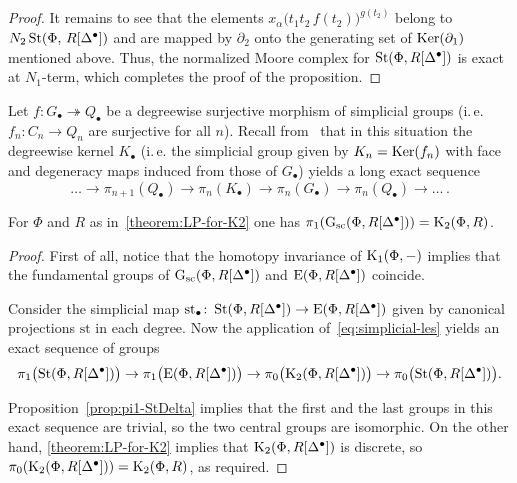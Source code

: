 \documentclass[oneside, 11pt]{amsart} \pdfoutput=1
\begin{document}
\begin{proof}
It remains to see that the elements $x_{\alpha}\big(t_1t_2\,f(t_2)\big)^{g(t_2)}$ belong to $N_2\mathop{\mathrm{St}}\nolimits(\Phi,\,R[\Delta^\bullet])$ and are mapped by $\partial_2$ onto the generating set of $\mathop{\mathrm{Ker}}\nolimits(\partial_1)$ mentioned above. Thus, the normalized Moore complex for $\mathop{\mathrm{St}}\nolimits(\Phi, R[\Delta^\bullet])$ is exact at $N_1$-term, which completes the proof of the proposition. \end{proof}

Let $f\colon G_\bullet\twoheadrightarrow Q_\bullet$ be a degreewise surjective morphism of simplicial groups (i.\,e. $f_n\colon C_n\to Q_n$ are surjective for all $n$). Recall from~\cite[Theorem~1.3]{Ina75} that in this situation the degreewise kernel $K_\bullet$ (i.\,e. the simplicial group given by $K_n = \mathop{\mathrm{Ker}}\nolimits(f_n)$ with face and degeneracy maps induced from those of $G_\bullet$) yields a long exact sequence
\begin{equation} \label{eq:simplicial-les}
\ldots \to \pi_{n + 1}(Q_\bullet) \to \pi_n(K_\bullet) \to \pi_n(G_\bullet) \to \pi_n(Q_\bullet) \to \ldots\,.
\end{equation}
\iffalse \begin{equation} \label{eq:simplicial-les} \begin{tikzcd} \ldots \ar{r} & \pi_{n+1}(Q_\bullet) \ar{r} & \pi_n(K_\bullet) \ar{r} & \pi_n(G_\bullet) \ar{r} & \pi_n(Q_\bullet) \ar{r} & \ldots\ . \end{tikzcd} \end{equation} \fi

\begin{theorem} \label{theorem:pi1-GRDelta}
 For $\Phi$ and $R$ as in~\cref{theorem:LP-for-K2} one has $\pi_1(\mathrm{G}_\mathrm{sc}(\Phi, R[\Delta^\bullet])) = {\mathrm{K}}_2(\Phi, R)$.
\end{theorem}
\begin{proof}
 First of all, notice that the homotopy invariance of ${\mathrm{K}}_1(\Phi, -)$ implies that the fundamental groups of $\mathrm{G}_\mathrm{sc}(\Phi, R[\Delta^\bullet])$ and $\mathrm{E}(\Phi, R[\Delta^\bullet])$ coincide. %
 
 Consider the simplicial map $\mathrm{st}_\bullet \colon \mathop{\mathrm{St}}\nolimits(\Phi, R[\Delta^\bullet]) \to \mathrm{E}(\Phi, R[\Delta^\bullet])$ given by canonical projections $\mathrm{st}$ in each degree. 
 Now the application of~\eqref{eq:simplicial-les} yields an exact sequence of groups
\[
\pi_1\bigl(\mathop{\mathrm{St}}\nolimits(\Phi, R[\Delta^\bullet])\bigr) \to \pi_1\bigl(\mathrm{E}(\Phi, R[\Delta^\bullet])\bigr) \to \pi_0\bigl({\mathrm{K}}_2(\Phi, R[\Delta^\bullet])\bigr) \to \pi_0\bigl(\mathop{\mathrm{St}}\nolimits(\Phi, R[\Delta^\bullet])\bigr).
\]
\iffalse \[
\begin{tikzcd} \pi_1(\St(\Phi, R[\Delta^\bullet])) \ar[r] & \pi_1(\E(\Phi, R[\Delta^\bullet])) \ar[r] & \pi_0(\K_2(\Phi, R[\Delta^\bullet])) \ar[r] & \pi_0(\St(\Phi, R[\Delta^\bullet])). \end{tikzcd}
\] \fi
 Proposition~\ref{prop:pi1-StDelta} implies that the first and the last groups in this exact sequence are trivial, so the two central groups are isomorphic. On the other hand, \cref{theorem:LP-for-K2} implies that ${\mathrm{K}}_2(\Phi, R[\Delta^\bullet])$ is discrete, so $\pi_0({\mathrm{K}}_2(\Phi, R[\Delta^\bullet])) = {\mathrm{K}}_2(\Phi, R)$, as required.
\end{proof}
\end{document}
